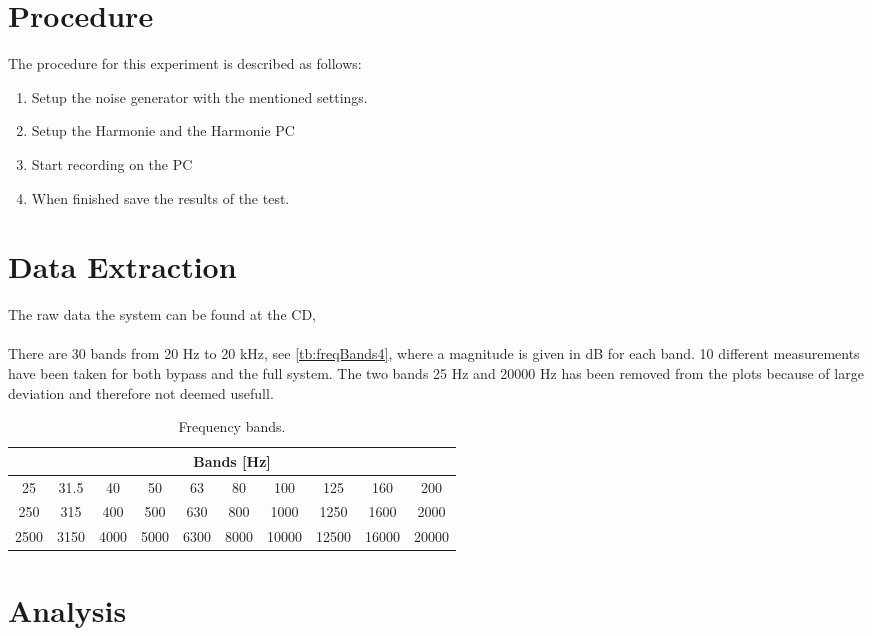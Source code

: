 \section{Procedure}
The procedure for this experiment is described as follows:
\vspace{-5mm}
\begin{enumerate}
\item Setup the noise generator with the mentioned settings.
\item Setup the Harmonie and the Harmonie PC
\item Start recording on the PC
\item When finished save the results of the test.
\end{enumerate}

\section{Data Extraction}
The raw data the system can be found at the CD, \\
\\
There are 30 bands from 20 Hz to 20 kHz, see \autoref{tb:freqBands4}, where a magnitude is given in dB for each band. 10 different measurements have been taken for both bypass and the full system. The two bands 25 Hz and 20000 Hz has been removed from the plots because of large deviation and therefore not deemed usefull.

\begin{table}[H]
\centering
\begin{tabular}{|c|c|c|c|c|c|c|c|c|c|}
\hline
\multicolumn{10}{|c|}{Bands [Hz]}                                       \\ \hline
25   & 31.5 & 40   & 50   & 63   & 80   & 100   & 125   & 160   & 200   \\ \hline
250  & 315  & 400  & 500  & 630  & 800  & 1000  & 1250  & 1600  & 2000  \\ \hline
2500 & 3150 & 4000 & 5000 & 6300 & 8000 & 10000 & 12500 & 16000 & 20000 \\ \hline
\end{tabular}
\caption{Frequency bands.}
\label{tb:freqBands4}
\end{table}

\section{Analysis}

